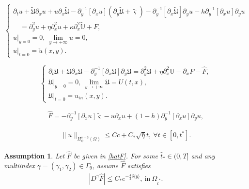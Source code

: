 \documentclass[10pt,a4paper]{amsart}
\newtheorem{assumption}{Assumption}
\newcommand\y{{{\langle y \rangle}}}
\begin{document}
\begin{equation}\label{app'}
\begin{cases}
\partial_{t}u
+\tilde{\mathfrak{U}}\partial_{x}u+u\partial_{x}\tilde{\mathfrak{U}}
-\partial_{y}^{-1}[\partial_{x}u](\partial_{y}\tilde{\mathfrak{U}}+\tilde{\varsigma})
-\partial_{y}^{-1}[\partial_{x}\tilde{\mathfrak{U}}]\partial_{y}u
-h\partial_{y}^{-1}[\partial_{x}u]\partial_{y}u\\
\quad
=\partial_{y}^{2}u+\eta\partial_{x}^{2}u+\kappa\partial_{x}^{2}\tilde{\mathbb{U}}+F,\\
u|_{y=0}=0,~\lim\limits_{y\to+\infty} u=0,\\
u|_{t=0}=\check{u}(x,y).
\end{cases}
\end{equation}

\begin{equation}\label{App+1}
\begin{cases}
\partial_{t}\mathfrak{U}
+\mathfrak{U}\partial_{x}\mathfrak{U}
-\partial_{y}^{-1}[\partial_{x}\mathfrak{U}]\partial_{y}\mathfrak{U}
=\partial_{y}^{2}\mathfrak{U}+\eta\partial_{x}^{2}\mathbb{U}-\partial_{x}P-\hat{F},\\
\mathfrak{U}|_{y=0}=0,~\lim\limits_{y\to+\infty}\mathfrak{U}=U(t,x),\\
\mathfrak{U}|_{t=0}=u_{in}(x,y).
\end{cases}
\end{equation}

\begin{align}\label{hatF}
\hat{F}=-\partial_{y}^{-1}[\partial_{x}u]\tilde{\varsigma}-u\partial_{x}u+(1-h)\partial_{y}^{-1}[\partial_{x}u]\partial_{y}u,
\end{align}

\begin{align}\label{us-3}
\|u\|_{H_{\psi}^{s-3}(\Omega)}\leq C\check{c}+C_{*}\sqrt{\bar{\eta}}t,~\forall t\in[0,t^{*}].
\end{align}

\begin{assumption}\label{FA}
Let $\hat{F}$ be given  in \eqref{hatF}. For some $\hat{t}_{*}\in(0,T]$ and any multiindex $\gamma=(\gamma_{1},\gamma_{2})\in\Gamma_{9}$, assume $\hat{F}$ satisfies
\begin{align}\label{Fd}
|D^{\gamma}\hat{F}|\leq C_{*}e^{-\frac{4}{3}\delta\y},~\text{in}~\Omega_{\hat{t}^{*}}.
\end{align}
\end{assumption}
\end{document}
